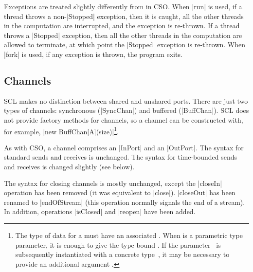 \documentclass[11pt,a4paper]{article}
\begin{document}
Exceptions are treated slightly differently from in CSO\@.  When |run| is
used, if a thread throws a non-|Stopped| exception, then it is caught, all the
other threads in the computation are interrupted, and the exception is
re-thrown.  If a thread throws a |Stopped| exception, then all the other
threads in the computation are allowed to terminate, at which point the
|Stopped| exception is re-thrown.  When |fork| is used, if any exception is
thrown, the program exits. 




\subsection*{Channels}

SCL makes no distinction between shared and unshared ports.  There are just
two types of channels: synchronous (|SyncChan|) and buffered (|BuffChan|).
SCL does not provide factory methods for channels, so a channel can be
constructed with, for example, |new BuffChan[A](size)|\footnote{The type
   of data for a  must have an associated
  .  When  is a parametric type parameter, it is
  enough to give the type bound .  If the
  parameter~ is subsequently instantiated with a concrete
  type~, it may be necessary to provide an additional argument
  .}.

As with CSO, a channel comprises an |InPort| and an |OutPort|.  The syntax for
standard sends and receives is unchanged.  The syntax for time-bounded sends
and receives is changed slightly (see below).  

The syntax for closing channels is mostly unchanged, except the |closeIn|
operation has been removed (it was equivalent to |close|).  |closeOut| has
been renamed to |endOfStream| (this operation normally signals the end of a
stream).  In addition, operations |isClosed| and |reopen| have been added.
\end{document}
